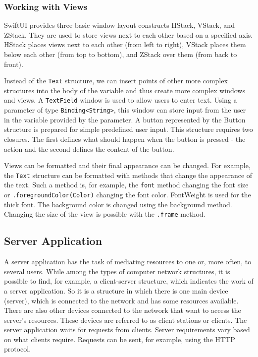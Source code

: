 \documentclass[
  biblatex = false,
  language=english,
  figures=false,
  sourcecodes,
  glossaries,
  index
]{kidiplom}
\begin{document}
\subsubsection{Working with Views}
SwiftUI provides three basic window layout constructs HStack, VStack, and ZStack. They are used to store views next to each other based on a specified axis. HStack places views next to each other (from left to right), VStack places them below each other (from top to bottom), and ZStack over them (from back to front).

Instead of the \texttt{Text} structure, we can insert points of other more complex structures into the body of the variable and thus create more complex windows and views. A \texttt{TextField} window is used to allow users to enter text. Using a parameter of type \texttt{Binding<String>}, this window can store input from the user in the variable provided by the parameter. A button represented by the Button structure is prepared for simple predefined user input. This structure requires two closures. The first defines what should happen when the button is pressed - the action and the second defines the content of the button.

Views can be formatted and their final appearance can be changed. For example, the \texttt{Text} structure can be formatted with methods that change the appearance of the text. Such a method is, for example, the \texttt{font} method changing the font size or \texttt{.foregroundColor(Color)} changing the font color. FontWeight is used for the thick font. The background color is changed using the background method. Changing the size of the view is possible with the \texttt{.frame} method.

\subsection{Server Application}
A server application has the task of mediating resources to one or, more often, to several users. While among the types of computer network structures, it is possible to find, for example, a client-server structure, which indicates the work of a server application. So it is a structure in which there is one main device (server), which is connected to the network and has some resources available. There are also other devices connected to the network that want to access the server's resources. These devices are referred to as client stations or clients. The server application waits for requests from clients. Server requirements vary based on what clients require. Requests can be sent, for example, using the HTTP protocol.
\end{document}
